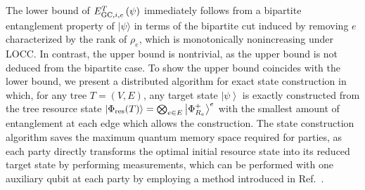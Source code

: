 \documentclass[preprintnumbers,aps,amsmath,amssymb,pra,twocolumn,showpacs,superscriptaddress,floatfix]{revtex4-1}
\def\Ket#1{\left|#1\right\rangle}
\newcommand{\ket}[1]{|{#1}\rangle}
\theoremstyle{plain}
\theoremstyle{definition}
\theoremstyle{remark}
\begin{document}
The lower bound of $E_{\textup{GC},i,e}^T\left(\psi\right)$ immediately follows from a bipartite entanglement property of $\ket{\psi}$ in terms of the bipartite cut induced by removing $e$ characterized by the rank of $\rho_e$, which is monotonically nonincreasing under LOCC\@.   In contrast, the upper bound is nontrivial, as the upper bound is not deduced from the bipartite case.   To show the upper bound coincides with the lower bound,  we present a distributed algorithm for exact state construction in which, for any tree $T=(V,E)$, any target state $\Ket{\psi}$ is exactly constructed from the tree resource state $\ket{\Phi_{\textup{res}}(T)}=\bigotimes_{e\in E}\Ket{\Phi^+_{R_e}}^e$ with the smallest amount of entanglement at each edge which allows the construction.  The state construction algorithm saves the maximum quantum memory space required for parties, as each party directly transforms the optimal initial resource state into its reduced target state by performing measurements, which can be performed with one auxiliary qubit at each party by employing a method introduced in Ref.~\cite{PhysRevA.77.052104}.
\end{document}
